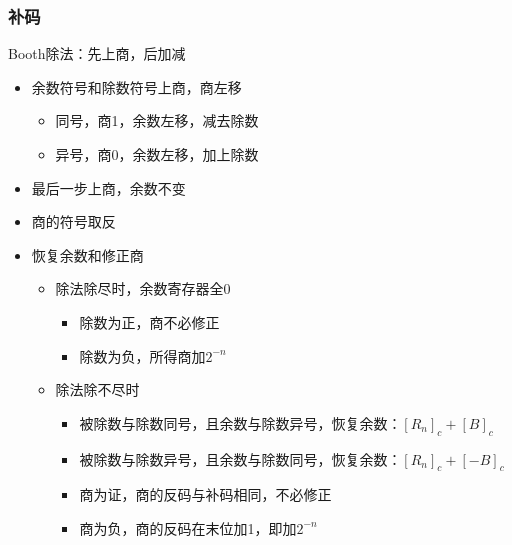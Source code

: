 \subsubsection{补码}
Booth除法：先上商，后加减
\begin{itemize}
	\item 余数符号和除数符号上商，商左移
	\begin{itemize}
		\item 同号，商1，余数左移，减去除数
		\item 异号，商0，余数左移，加上除数
	\end{itemize}
	\item 最后一步上商，余数不变
	\item 商的符号取反
	\item 恢复余数和修正商
	\begin{itemize}
		\item 除法除尽时，余数寄存器全0
		\begin{itemize}
			\item 除数为正，商不必修正
			\item 除数为负，所得商加$2^{-n}$
		\end{itemize}
		\item 除法除不尽时
		\begin{itemize}
			\item 被除数与除数同号，且余数与除数异号，恢复余数：$[R_n]_c+[B]_c$
			\item 被除数与除数异号，且余数与除数同号，恢复余数：$[R_n]_c+[-B]_c$
			\item 商为证，商的反码与补码相同，不必修正
			\item 商为负，商的反码在末位加1，即加$2^{-n}$
		\end{itemize}
	\end{itemize}
\end{itemize}